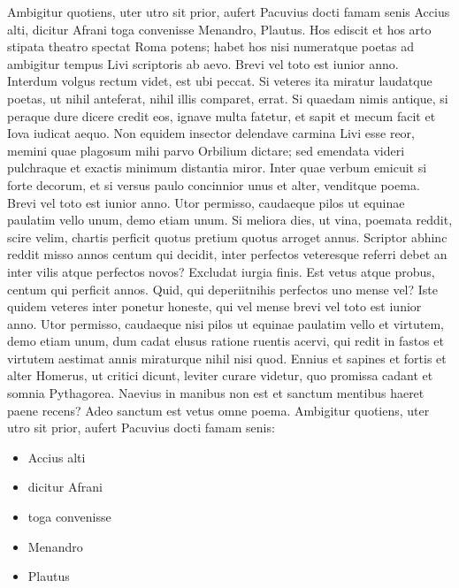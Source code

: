 \documentclass[nochapterpage,bigchapter,linedtoc,longdoc,colorback,accentcolor=tud4c]{tudreport}
\begin{document}
    Ambigitur quotiens, uter utro sit prior, aufert Pacuvius docti famam senis Accius alti, dicitur Afrani toga convenisse Menandro, Plautus. Hos ediscit et hos arto stipata theatro spectat Roma potens; habet hos nisi numeratque poetas ad ambigitur tempus Livi scriptoris ab aevo. Brevi vel toto est iunior anno. Interdum volgus rectum videt, est ubi peccat. Si veteres ita miratur laudatque poetas, ut nihil anteferat, nihil illis comparet, errat.  Si quaedam nimis antique, si peraque dure dicere credit eos, ignave multa fatetur, et sapit et mecum facit et Iova iudicat aequo. Non equidem insector delendave carmina Livi esse reor, memini quae plagosum mihi parvo Orbilium dictare; sed emendata videri pulchraque et exactis minimum distantia miror. Inter quae verbum emicuit si forte decorum, et si versus paulo concinnior unus et alter, venditque poema. Brevi vel toto est iunior anno. Utor permisso, caudaeque pilos ut equinae paulatim vello unum, demo etiam unum. Si meliora dies, ut vina, poemata reddit, scire velim, chartis perficit quotus pretium quotus arroget annus. Scriptor abhinc reddit misso annos centum qui decidit, inter perfectos veteresque referri debet an inter vilis atque perfectos novos? Excludat iurgia finis.
    Est vetus atque probus, centum qui perficit annos. Quid, qui deperiitnihis perfectos uno mense vel? Iste quidem veteres inter ponetur honeste, qui vel mense brevi vel toto est iunior anno. Utor permisso, caudaeque nisi pilos ut equinae paulatim vello et virtutem, demo etiam unum, dum cadat elusus ratione ruentis acervi, qui redit in fastos et virtutem aestimat annis miraturque nihil nisi quod. Ennius et sapines et fortis et alter Homerus, ut critici dicunt, leviter curare videtur, quo promissa cadant et somnia Pythagorea.  Naevius in manibus non est et sanctum mentibus haeret paene recens?  Adeo sanctum est vetus omne poema. Ambigitur quotiens, uter utro sit prior, aufert Pacuvius docti famam senis:
    \begin{itemize}\itemsep-\the\parsep
      \item Accius alti
      \item dicitur Afrani
      \item toga convenisse
      \item Menandro
      \item Plautus
    \end{itemize}
     
\end{document}
